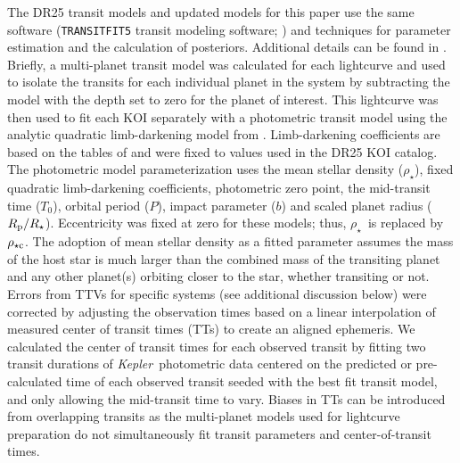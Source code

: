 \documentclass{aastex62}
\newcommand{\ik}{{\it Kepler~}}
\newcommand{\rprs}{\ensuremath{R_{\rm p}/R_\star}}
\newcommand{\rhostar}{\ensuremath{\rho_\star}}
\newcommand{\rhoc}{\ensuremath{\rho_{\star {\rm c}}}}
\begin{document}

The DR25 transit models and updated models for this paper use the same software (\texttt{TRANSITFIT5} transit modeling software; \citealt{Rowe:2015,Rowe:2016}) and techniques for parameter estimation and the calculation of posteriors.  Additional details can be found in \cite{Rowe:2014, Rowe:2015, Thompson:2018}.  Briefly, a multi-planet transit model was calculated for each lightcurve and used to isolate the transits for each individual planet in the system by subtracting the model with the depth set to zero for the planet of interest.  This lightcurve was then used to fit each KOI separately with a photometric transit model using the analytic quadratic limb-darkening model from \cite{Mandel:2002}. Limb-darkening coefficients are based on the tables of \citet{Claret:2011} and were fixed to values used in the DR25 KOI catalog.  The photometric model parameterization uses the mean stellar density (\rhostar), fixed quadratic limb-darkening coefficients, photometric zero point, the mid-transit time ($T_0$), orbital period ($P$), impact parameter ($b$) and scaled planet radius (\rprs). Eccentricity was fixed at zero for these models; thus, \rhostar~is replaced by \rhoc.  The adoption of mean stellar density as a fitted parameter assumes the mass of the host star is much larger than the combined mass of the transiting planet and any other planet(s) orbiting closer to the star, whether transiting or not.  Errors from TTVs for specific systems (see additional discussion below) were corrected by adjusting the observation times based on a linear interpolation of measured center of transit times (TTs) to create an aligned ephemeris.  {We calculated the center of transit times for each observed transit by fitting two transit durations of \ik photometric data centered on the predicted or pre-calculated time of each observed transit seeded with the best fit transit model, and only allowing the mid-transit time to vary.}  Biases in TTs can be introduced from overlapping transits as the multi-planet models used for lightcurve preparation do not simultaneously fit transit parameters and center-of-transit times.
\end{document}
